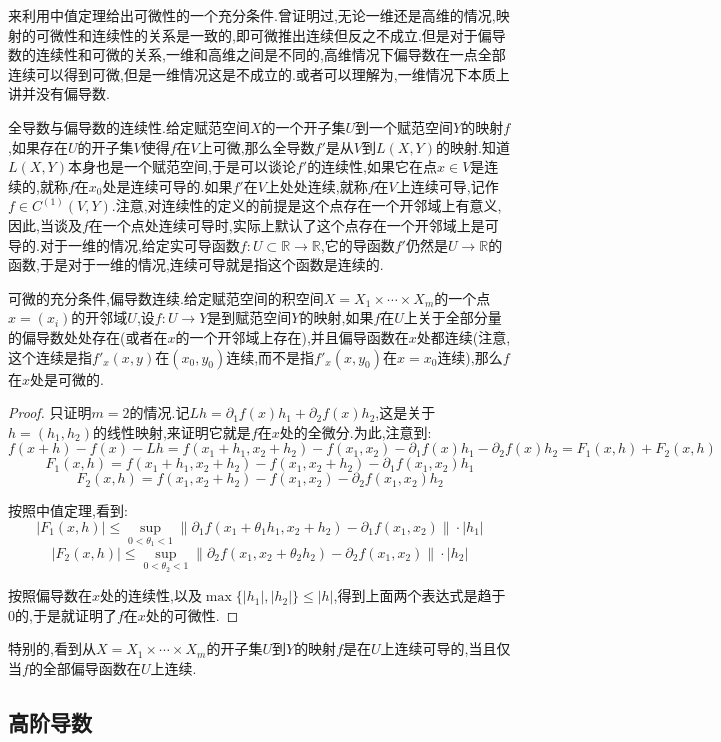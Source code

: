 来利用中值定理给出可微性的一个充分条件.曾证明过,无论一维还是高维的情况,映射的可微性和连续性的关系是一致的,即可微推出连续但反之不成立.但是对于偏导数的连续性和可微的关系,一维和高维之间是不同的,高维情况下偏导数在一点全部连续可以得到可微,但是一维情况这是不成立的.或者可以理解为,一维情况下本质上讲并没有偏导数.

全导数与偏导数的连续性.给定赋范空间$X$的一个开子集$U$到一个赋范空间$Y$的映射$f$,如果存在$U$的开子集$V$使得$f$在$V$上可微,那么全导数$f'$是从$V$到$L(X,Y)$的映射.知道$L(X,Y)$本身也是一个赋范空间,于是可以谈论$f'$的连续性,如果它在点$x\in V$是连续的,就称$f$在$x_0$处是连续可导的.如果$f'$在$V$上处处连续,就称$f$在$V$上连续可导,记作$f\in C^{(1)}(V,Y)$.注意,对连续性的定义的前提是这个点存在一个开邻域上有意义,因此,当谈及$f$在一个点处连续可导时,实际上默认了这个点存在一个开邻域上是可导的.对于一维的情况,给定实可导函数$f:U\subset\mathbb{R}\to\mathbb{R}$,它的导函数$f'$仍然是$U\to\mathbb{R}$的函数,于是对于一维的情况,连续可导就是指这个函数是连续的.

可微的充分条件,偏导数连续.给定赋范空间的积空间$X=X_1\times\cdots\times X_m$的一个点$x=(x_i)$的开邻域$U$,设$f:U\to Y$是到赋范空间$Y$的映射,如果$f$在$U$上关于全部分量的偏导数处处存在(或者在$x$的一个开邻域上存在),并且偏导函数在$x$处都连续(注意,这个连续是指$f'_x(x,y)$在$(x_0,y_0)$连续,而不是指$f'_x(x,y_0)$在$x=x_0$连续),那么$f$在$x$处是可微的.
\begin{proof}
	
	只证明$m=2$的情况.记$Lh=\partial_1f(x)h_1+\partial_2f(x)h_2$,这是关于$h=(h_1,h_2)$的线性映射,来证明它就是$f$在$x$处的全微分.为此,注意到:
	$$f(x+h)-f(x)-Lh=f(x_1+h_1,x_2+h_2)-f(x_1,x_2)-\partial_1f(x)h_1-\partial_2f(x)h_2=F_1(x,h)+F_2(x,h)$$
	$$F_1(x,h)=f(x_1+h_1,x_2+h_2)-f(x_1,x_2+h_2)-\partial_1f(x_1,x_2)h_1$$
	$$F_2(x,h)=f(x_1,x_2+h_2)-f(x_1,x_2)-\partial_2f(x_1,x_2)h_2$$
	
	按照中值定理,看到:
	$$|F_1(x,h)|\le\sup_{0<\theta_1<1}\|\partial_1f(x_1+\theta_1h_1,x_2+h_2)-\partial_1f(x_1,x_2)\|\cdot|h_1|$$
	$$|F_2(x,h)|\le\sup_{0<\theta_2<1}\|\partial_2f(x_1,x_2+\theta_2h_2)-\partial_2f(x_1,x_2)\|\cdot|h_2|$$
	
	按照偏导数在$x$处的连续性,以及$\max\{|h_1|,|h_2|\}\le|h|$,得到上面两个表达式是趋于0的,于是就证明了$f$在$x$处的可微性.
	
\end{proof}

特别的,看到从$X=X_1\times\cdots\times X_m$的开子集$U$到$Y$的映射$f$是在$U$上连续可导的,当且仅当$f$的全部偏导函数在$U$上连续.
\newpage
\subsection{高阶导数}

